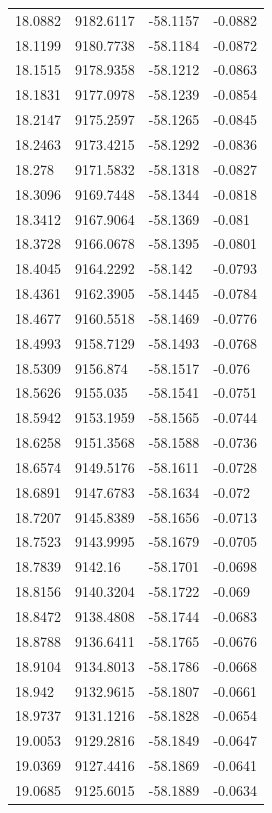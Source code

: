 \begin{table}[H]
\begin{tabular}{llll}
18.0882 & 9182.6117 & -58.1157 & -0.0882 \\
18.1199 & 9180.7738 & -58.1184 & -0.0872 \\
18.1515 & 9178.9358 & -58.1212 & -0.0863 \\
18.1831 & 9177.0978 & -58.1239 & -0.0854 \\
18.2147 & 9175.2597 & -58.1265 & -0.0845 \\
18.2463 & 9173.4215 & -58.1292 & -0.0836 \\
18.278 & 9171.5832 & -58.1318 & -0.0827 \\
18.3096 & 9169.7448 & -58.1344 & -0.0818 \\
18.3412 & 9167.9064 & -58.1369 & -0.081 \\
18.3728 & 9166.0678 & -58.1395 & -0.0801 \\
18.4045 & 9164.2292 & -58.142 & -0.0793 \\
18.4361 & 9162.3905 & -58.1445 & -0.0784 \\
18.4677 & 9160.5518 & -58.1469 & -0.0776 \\
18.4993 & 9158.7129 & -58.1493 & -0.0768 \\
18.5309 & 9156.874 & -58.1517 & -0.076 \\
18.5626 & 9155.035 & -58.1541 & -0.0751 \\
18.5942 & 9153.1959 & -58.1565 & -0.0744 \\
18.6258 & 9151.3568 & -58.1588 & -0.0736 \\
18.6574 & 9149.5176 & -58.1611 & -0.0728 \\
18.6891 & 9147.6783 & -58.1634 & -0.072 \\
18.7207 & 9145.8389 & -58.1656 & -0.0713 \\
18.7523 & 9143.9995 & -58.1679 & -0.0705 \\
18.7839 & 9142.16 & -58.1701 & -0.0698 \\
18.8156 & 9140.3204 & -58.1722 & -0.069 \\
18.8472 & 9138.4808 & -58.1744 & -0.0683 \\
18.8788 & 9136.6411 & -58.1765 & -0.0676 \\
18.9104 & 9134.8013 & -58.1786 & -0.0668 \\
18.942 & 9132.9615 & -58.1807 & -0.0661 \\
18.9737 & 9131.1216 & -58.1828 & -0.0654 \\
19.0053 & 9129.2816 & -58.1849 & -0.0647 \\
19.0369 & 9127.4416 & -58.1869 & -0.0641 \\
19.0685 & 9125.6015 & -58.1889 & -0.0634 \\

\end{tabular}
\end{table}
